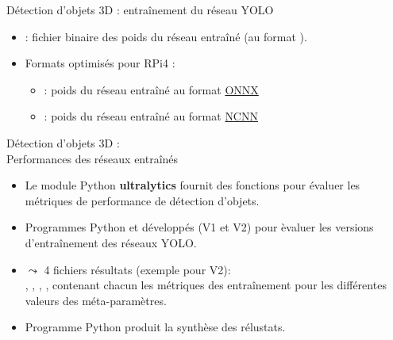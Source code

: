 \documentclass[11pt,serif,mathserif,compress,hyperref={colorlinks}]{beamer}
\begin{document}
\begin{frame}{Détection d'objets 3D : entraînement du réseau YOLO}
  
  \begin{tcolorbox}[title={Contenu des dossiers\\ \textbf{UCIA-YOLOvvv/batch-BB\_epo-EEE/weights}}, add to width=.7cm]
    \begin{itemize}
    \item {} : fichier binaire des poids du réseau entraîné (au format ).
    \item Formats optimisés pour RPi4 :
      \begin{itemize}
      \item {} : poids du réseau entraîné au format \href{https://docs.ultralytics.com/fr/integrations/onnx/}{ONNX}
      \item {} : poids du réseau entraîné au format \href{https://docs.ultralytics.com/fr/integrations/ncnn/}{NCNN}
      \end{itemize}
    \end{itemize}
    
  \end{tcolorbox}
    
\end{frame}

\begin{frame}{Détection d'objets 3D : \\Performances des réseaux entraînés}

  \begin{itemize}
  \item Le module Python \textbf{ultralytics} fournit des fonctions pour évaluer les
    métriques de performance de détection d'objets.\smallskip
    
  \item Programmes Python  et  développés 
    (V1 et V2) pour èvaluer les versions d’entraînement des réseaux YOLO.\smallskip
    
  \item $\leadsto$ 4 fichiers résultats (exemple pour V2): \\
    ,  ,
    ,  , 
    contenant chacun les métriques des entraînement pour les différentes valeurs des méta-paramètres.

  \item Programme Python  produit la synthèse des rélustats.\smallskip
    
  \end{itemize}
    
\end{frame}
\end{document}
